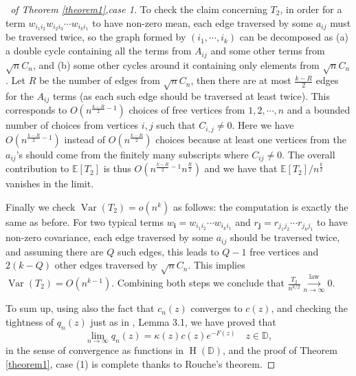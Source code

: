 \documentclass[12pt, reqno]{amsart}
\theoremstyle{definition}
\theoremstyle{remark}
\numberwithin{equation}{section}
\begin{document}
\begin{proof}[\proofname\ of Theorem \ref{theorem1},case 1]
To check the claim concerning $T_2$, in order for a term $w_{i_1i_2}w_{i_2i_3}\cdots w_{i_ki_1}$ to have non-zero mean, each edge traversed by some $a_{ij}$ must be traversed twice, so the graph formed by $(i_1,\cdots,i_k)$ can be decomposed as (a) a double cycle containing all the terms from $A_{ij}$ and some other terms from $\sqrt{n}C_n$, and (b) some other cycles around it containing only elements from $\sqrt{n}C_n$. Let $R$ be the number of edges from $\sqrt{n}C_n$, then there are at most $\frac{k-R}{2}$ edges for the $A_{ij}$ terms (as each such edge should be traversed at least twice). This corresponds to $O(n^{\frac{k-R}{2}-1})$ choices of free vertices from $1,2,\cdots,n$ and a bounded number of choices from vertices $i,j$ such that $C_{i,j}\neq 0$. Here we have $O(n^{\frac{k-R}{2}-1})$ instead of $O(n^{\frac{k-R}{2}})$ choices because at least one vertices from the $a_{ij}$'s should come from the finitely many subscripts where $C_{ij}\neq 0$. The overall contribution to $\mathbb{E}[T_2]$ is thus $O(n^{\frac{k-R}{2}-1}n^{\frac{R}{2}})$ and we have that $\mathbb{E}[T_2]/n^\frac{k}{2}$ vanishes in the limit. 

Finally we check $\operatorname{Var}(T_2)=o(n^{k})$ as follows: the computation is exactly the same as before. For two typical terms $w_{\mathbf{i}}=w_{i_1i_2}\cdots w_{i_ki_1}$ and $r_{\mathbf{j}}=r_{j_1j_2}\cdots r_{j_kj_1}$ to have non-zero covariance, each edge traversed by some $a_{ij}$ should be traversed twice, and assuming there are $Q$ such edges, this leads to $Q-1$ free vertices and $2(k-Q)$ other edges traversed by $\sqrt{n}C_n$. This implies $\operatorname{Var}(T_2)=O(n^{k-1})$. Combining both steps we conclude that $\frac{T_2}{n^{k/2}}\overset{\text{law}}{\underset{n\to\infty}\longrightarrow}0$.

To sum up, using also the fact that $c_n(z)$ converges to $c(z)$, and checking the tightness of $q_n(z)$ just as in \cite{bordenave2021convergence}, Lemma 3.1, we have proved that 
\begin{equation}
    \lim_{n\to\infty }q_n(z)=\kappa(z) c(z)e^{-F(z)}\quad z\in\mathbb{D},
\end{equation} in the sense of convergence as functions in $\operatorname{H}(\mathbb{D})$, and the proof of Theorem \ref{theorem1}, case (1) is complete thanks to Rouche's theorem.
\end{proof}
\end{document}
